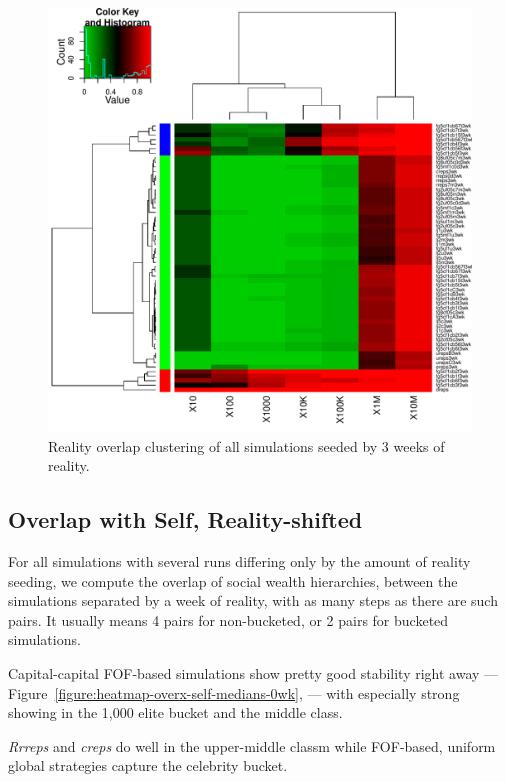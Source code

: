\documentclass[10pt,oneside]{memoir}
\begin{document}
\begin{figure}
\begin{center}
    \includegraphics{figures/heatmap-overx-dreps-medians-3wk}
    \caption{Reality overlap clustering of all simulations seeded by 3 weeks of reality.}
    \label{figure:heatmap-overx-dreps-medians-3wk}
\end{center}
\end{figure}
\pagebreak \subsection{Overlap with Self, Reality-shifted}
\label{overlapwithselfreality-shifted}

For all simulations with several runs differing only by the amount of reality seeding, we compute the overlap of social wealth hierarchies, between the simulations separated by a week of reality, with as many steps as there are such pairs.  It usually means 4 pairs for non-bucketed, or 2 pairs for bucketed simulations.


Capital-capital FOF-based simulations show pretty good stability right away --- Figure~\ref{figure:heatmap-overx-self-medians-0wk}, --- with especially strong showing in the 1,000 elite bucket and the middle class.


{\itshape Rrreps} and {\itshape creps} do well in the upper-middle classm while FOF-based, uniform global strategies capture the celebrity bucket.
\end{document}
